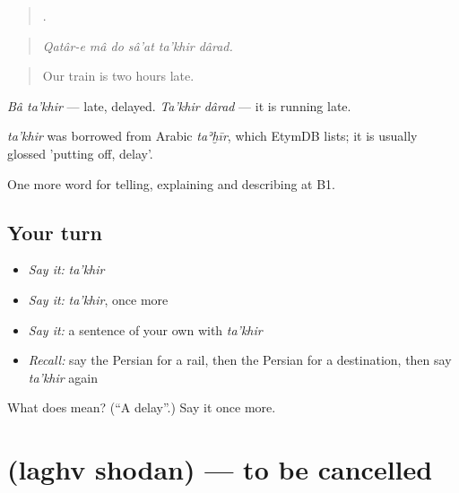 \begin{quote}
     .
\end{quote}

\begin{quote}
\emph{Qatâr-e mâ do sâ'at ta'khir dârad.}
\end{quote}

\begin{quote}
Our train is two hours late.
\end{quote}

\emph{Bâ ta'khir} — late, delayed. \emph{Ta'khir dârad} — it is running late.

\begin{cousinweb}
\emph{ta'khir} was borrowed from Arabic \emph{taʾḫīr}, which EtymDB lists; it is usually glossed 'putting off, delay'.
\end{cousinweb}

\begin{grammarlens}[title={What you've built}]
One more word for telling, explaining and describing at B1.
\end{grammarlens}

\subsection*{Your turn}
\begin{itemize}
\raggedright
  \item \emph{Say it:} \emph{ta'khir}
  \item \emph{Say it:} \emph{ta'khir}, once more
  \item \emph{Say it:} a sentence of your own with \emph{ta'khir}
  \item \emph{Recall:} say the Persian for a rail, then the Persian for a destination, then say \emph{ta'khir} again
\end{itemize}

\begin{tcolorbox}[breakable,colback=teal!4,colframe=teal!35!black,title={Before you move on}]
What does  mean? (\textquotedblleft{}A delay\textquotedblright{}.) Say it once more.
\end{tcolorbox}
\section[\texorpdfstring{\fa{لغو} \fa{شدن} (laghv shodan)}{لغو شدن (laghv shodan)}]{  (laghv shodan) — to be cancelled}

